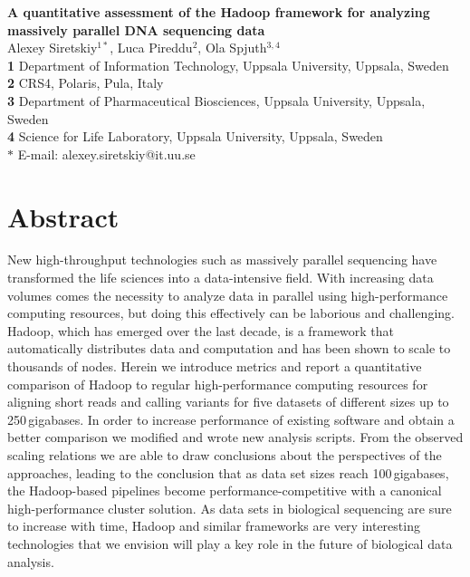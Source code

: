 \documentclass[10pt]{article}
\date{}
\begin{document}
\begin{flushleft}
{\Large
\textbf{A quantitative assessment of the Hadoop framework for analyzing massively parallel DNA sequencing data}
}
\\
Alexey Siretskiy$^{1 \ast}$,
Luca Pireddu$^{2}$,
Ola Spjuth$^{3,4}$
\\
{\bf 1} Department of Information Technology, Uppsala University, Uppsala, Sweden
 \\
{\bf 2} CRS4, Polaris, Pula, Italy
 \\
{\bf 3} Department of Pharmaceutical Biosciences, Uppsala University, Uppsala, Sweden
 \\
{\bf 4} Science for Life Laboratory, Uppsala University, Uppsala, Sweden
\\
$\ast$ E-mail: alexey.siretskiy@it.uu.se
\end{flushleft}

\section*{Abstract}
New high-throughput technologies such as massively parallel sequencing have transformed the life sciences into a data-intensive field. With increasing data volumes comes the necessity to analyze data in parallel using high-performance computing resources, but doing this effectively can be laborious and challenging.
Hadoop, which has emerged over the last decade, is a framework that automatically distributes data and computation and has been shown to scale to thousands of nodes. Herein we introduce metrics and report a quantitative comparison of Hadoop to regular high-performance computing resources for aligning short reads and calling variants for five datasets of different sizes up to 250\,gigabases. In order to increase performance of existing software and obtain a better comparison we modified and wrote new analysis scripts. From the observed scaling relations we are able to draw conclusions about the perspectives of the approaches, leading to the conclusion that as data set sizes reach 100\,gigabases, the Hadoop-based pipelines become performance-competitive with a canonical high-performance cluster solution. As data sets in biological sequencing are sure to increase with time, Hadoop and similar frameworks are very interesting technologies that we envision will play a key role in the future of biological data analysis.
\end{document}
